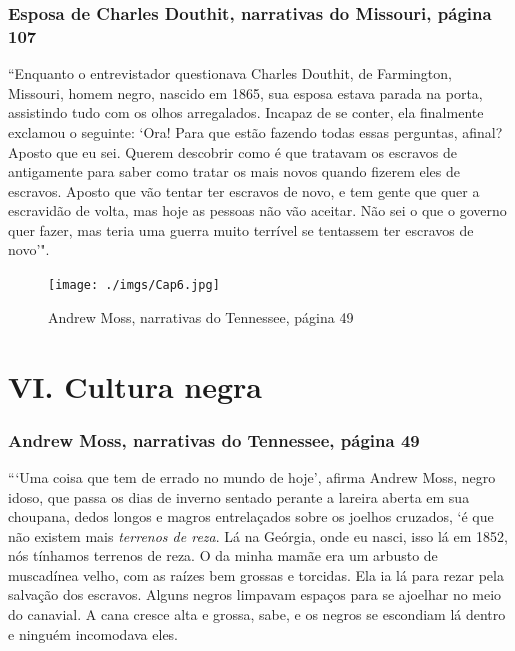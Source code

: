 \subsection{Esposa de Charles Douthit, narrativas do Missouri, página 107} \label{ref75}

``Enquanto o entrevistador questionava Charles Douthit, de
Farmington, Missouri, homem negro, nascido em 1865, sua esposa estava
parada na porta, assistindo tudo com os olhos arregalados. Incapaz de se
conter, ela finalmente exclamou o seguinte: `Ora! Para que estão fazendo
todas essas perguntas, afinal? Aposto que eu sei. Querem descobrir como
é que tratavam os escravos de antigamente para saber como tratar os mais
novos quando fizerem eles de escravos. Aposto que vão tentar ter
escravos de novo, e tem gente que quer a escravidão de volta, mas hoje
as pessoas não vão aceitar. Não sei o que o governo quer fazer, mas
teria uma guerra muito terrível se tentassem ter escravos de novo'".

\pagebreak
\thispagestyle{empty}

\begin{absolutelynopagebreak}
\begin{vplace}
\begin{figure}[H]
\begin{adjustwidth}{-1.6cm}{}
  \vspace*{-2cm}
  \texttt{[image: ./imgs/Cap6.jpg]}  
\end{adjustwidth}
  \caption{Andrew Moss, narrativas do Tennessee, página 49}
\end{figure}
\end{vplace}

\end{absolutelynopagebreak}

\chapter{VI. Cultura negra}

\subsection{Andrew Moss, narrativas do Tennessee, página 49}
\label{ref202}

```Uma coisa que tem de errado no mundo de hoje', afirma Andrew Moss,
negro idoso, que passa os dias de inverno sentado perante a lareira
aberta em sua choupana, dedos longos e magros entrelaçados sobre os
joelhos cruzados, `é que não existem mais \emph{terrenos de reza}. Lá na
Geórgia, onde eu nasci, isso lá em 1852, nós tínhamos terrenos de reza.
O da minha mamãe era um arbusto de muscadínea velho, com as raízes bem
grossas e torcidas. Ela ia lá para rezar pela salvação dos escravos.
Alguns negros limpavam espaços para se ajoelhar no meio do canavial. A
cana cresce alta e grossa, sabe, e os negros se escondiam lá dentro e
ninguém incomodava eles.

